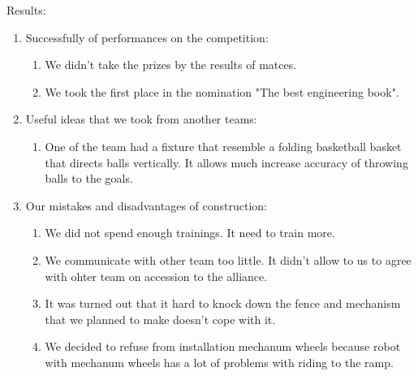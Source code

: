 Results:
\begin{enumerate}
  \item Successfully of performances on the competition:
  \begin{enumerate}
	\item We didn't take the prizes by the results of matces.
	
	\item We took the first place in the nomination "The best engineering book".
	
  \end{enumerate}
  
  \item Useful ideas that we took from another teams:
  \begin{enumerate}
  	
	
	
	
	
	
	\item One of the team had a fixture that resemble a folding basketball basket that directs balls vertically. It allows much increase accuracy of throwing balls to the goals.
	
  \end{enumerate}
  
  \item Our mistakes and disadvantages of construction:
  \begin{enumerate}
  	\item We did not spend enough trainings. It need to train  more.
  	
  	\item We communicate with other team too little. It didn't allow to us to agree with ohter team on accession to the alliance.
  	
  	\item It was turned out that it hard to knock down the fence and mechanism that we planned to make doesn't cope with it.
  	
  	\item We decided to refuse from installation mechanum wheels because robot with mechanum wheels has a lot of problems with riding to the ramp.
  	

\end{enumerate}
\end{enumerate}
